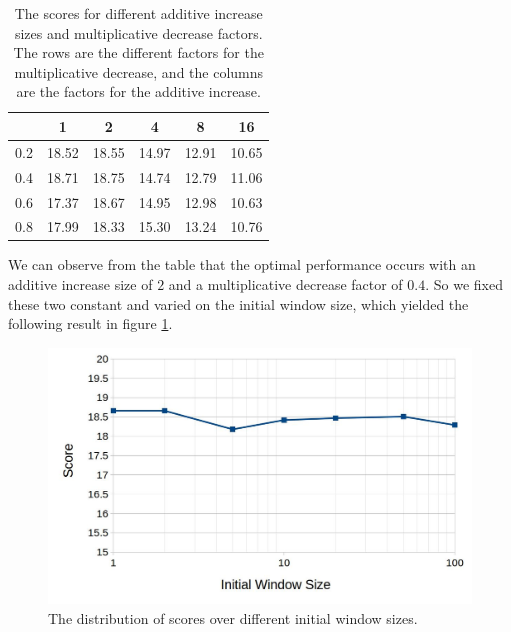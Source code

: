 \documentclass[11pt,a4paper]{article}
\begin{document}
\begin{table}[h]
  \centering
  \begin{tabular}{|c|r|r|r|r|r|}
    \hline
    \multicolumn{1}{|l|}{} & \multicolumn{1}{c|}{1} & \multicolumn{1}{c|}{2} &
    \multicolumn{1}{c|}{4} & \multicolumn{1}{c|}{8} & \multicolumn{1}{c|}{16} \\
    \hline
    0.2                    & 18.52                  & 18.55                  &
    14.97                  & 12.91                  & 10.65                   \\
    \hline
    0.4                    & 18.71                  & 18.75                  &
    14.74                  & 12.79                  & 11.06                   \\
    \hline
    0.6                    & 17.37                  & 18.67                  &
    14.95                  & 12.98                  & 10.63                   \\
    \hline
    0.8                    & 17.99                  & 18.33                  &
    15.30                  & 13.24                  & 10.76                   \\
    \hline
  \end{tabular}
  \caption{The scores for different additive increase sizes and multiplicative
  decrease factors. The rows are the different factors for the multiplicative
decrease, and the columns are the factors for the additive increase.}
  \label{tab:warmup-b}
\end{table}
  
  We can observe from the table that the optimal performance occurs with an
  additive increase size of $2$ and a multiplicative decrease factor of $0.4$.
  So we fixed these two constant and varied on the initial window size, which
  yielded the following result in figure \ref{tab:warmup-b2}.

  \begin{figure}[h]
  \centering
  \includegraphics[scale=0.35]{warmup-b}
  \caption{The distribution of scores over different initial window sizes.}
  \label{tab:warmup-b2}
\end{figure}
\end{document}
